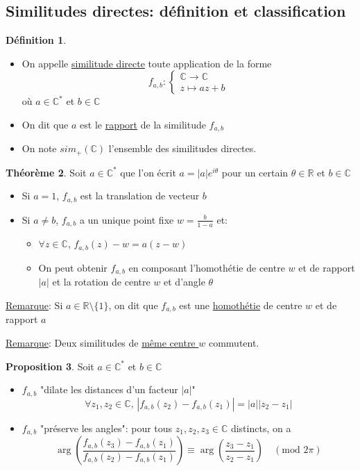 \documentclass[10pt,a4paper]{article}
\theoremstyle{definition}
\newtheorem{proposition}{Proposition}[section]
\newtheorem{theorem}[proposition]{Théorème}
\newtheorem{definition}[proposition]{Définition}
\begin{document}
\subsection{Similitudes directes: définition et classification}
\begin{definition}
\hfill
\begin{itemize}
\item On appelle \uline{similitude directe} toute application de la forme
\[f_{a, b}: \begin{cases}
\mathbb{C} \to \mathbb{C} \\
z \mapsto az + b
\end{cases} \]
où $a \in \mathbb{C}^*$ et $b \in \mathbb{C}$
\item On dit que $a$ est le \uline{rapport} de la similitude $f_{a,b}$
\item On note $sim_+(\mathbb{C})$ l'ensemble des similitudes directes.
\end{itemize}
\end{definition}
\begin{theorem}
Soit $a \in \mathbb{C}^*$ que l'on écrit $a = |a|e^{i\theta}$ pour un certain $\theta \in \mathbb{R}$ et $b \in \mathbb{C}$
\begin{itemize}
\item Si $a = 1$, $f_{a, b}$ est la translation de vecteur $b$
\item Si $a \neq b$, $f_{a, b}$ a un unique point fixe $w = \frac{b}{1 - a}$ et:
\begin{itemize}
\item $\forall z \in \mathbb{C}$, $f_{a, b}(z) - w = a(z - w)$
\item On peut obtenir $f_{a, b}$ en composant l'homothétie de centre $w$ et de rapport $|a|$ et la rotation de centre $w$ et d'angle $\theta$
\end{itemize}
\end{itemize}
\end{theorem}
\noindent \uline{Remarque}: Si $a \in \mathbb{R} \setminus \{1\}$, on dit que $f_{a,b}$ est une \uline{homothétie} de centre $w$ et de rapport $a$ \medskip

\noindent \uline{Remarque}: Deux similitudes de \uline{même centre $w$} commutent.
\begin{proposition}
Soit $a \in \mathbb{C}^*$ et $b \in \mathbb{C}$
\begin{itemize}
\item $f_{a, b}$ "dilate les distances d'un facteur $|a|$"
\[ \forall z_1, z_2 \in \mathbb{C} ,\, \left| f_{a, b}(z_2) - f_{a, b}(z_1) \right| = |a| |z_2 - z_1| \]
\item $f_{a, b}$ "préserve les angles": pour tous $z_1, z_2, z_3 \in \mathbb{C}$ distincts, on a
\[ \arg\left(\frac{f_{a, b}(z_3) - f_{a, b}(z_1)}{f_{a, b}(z_2) - f_{a, b}(z_1)}\right) \equiv \arg\left(\frac{z_3 - z_1}{z_2 - z_1}\right) \quad (\text{mod }2\pi) \]
\end{itemize}
\end{proposition}
\end{document}

